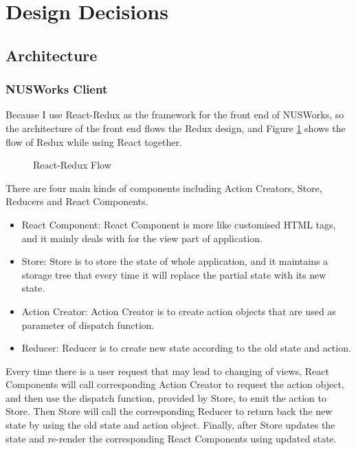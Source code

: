 \documentclass[fyp]{socreport}
\begin{document}
\section{Design Decisions}
\subsection{Architecture}
\subsubsection{NUSWorks Client}
Because I use React-Redux as the framework for the front end of NUSWorks, so the architecture of the front end flows the Redux design, and Figure {\ref{redux}} shows the flow of Redux while using React together.

\begin{figure}
\caption{React-Redux Flow}
\label{redux}
\end{figure}

There are four main kinds of components including Action Creators, Store, Reducers and React Components.

\begin{itemize}
	\item React Component: React Component is more like customised HTML tags, and it mainly deals with for the view part of application.
	\item Store: Store is to store the state of whole application, and it maintains a storage tree that every time it will replace the partial state with its new state.
	\item Action Creator: Action Creator is to create action objects that are used as parameter of dispatch function.
	\item Reducer: Reducer is to create new state according to the old state and action.
\end{itemize}

Every time there is a user request that may lead to changing of views, React Components will call corresponding Action Creator to request the action object, and then use the dispatch function, provided by Store, to emit the action to Store. Then Store will call the corresponding Reducer to return back the new state by using the old state and action object. Finally, after Store updates the state and re-render the corresponding React Components using updated state.
\end{document}
